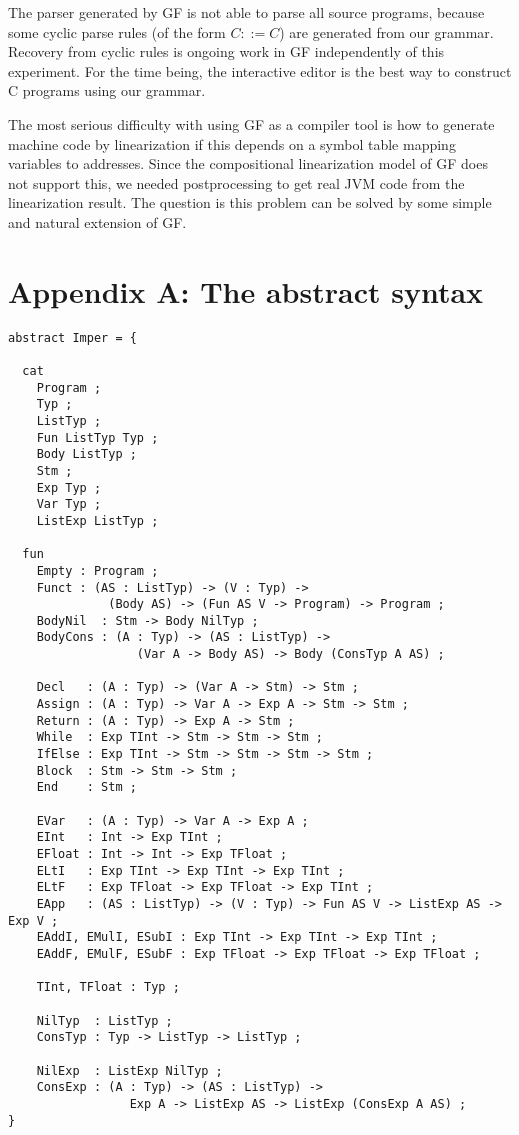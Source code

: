\documentclass[12pt]{article}
\begin{document}
The parser generated by GF is not able to parse all
source programs, because some cyclic parse
rules (of the form $C ::= C$) are generated from our grammar. 
Recovery from cyclic rules is ongoing work in GF independently of this
experiment. For the time being, the interactive editor is the best way to
construct C programs using our grammar.

The most serious difficulty with using GF as a compiler tool
is how to generate machine code by linearization if this depends on
a symbol table mapping variables to addresses.
Since the compositional linearization model of GF does not
support this, we needed postprocessing to get real JVM code
from the linearization result. The question is this problem can
be solved by some simple and natural extension of GF.








\newpage
\section*{Appendix A: The abstract syntax}

\small
\begin{verbatim}
abstract Imper = {

  cat
    Program ;
    Typ ;
    ListTyp ;
    Fun ListTyp Typ ;
    Body ListTyp ;
    Stm ;
    Exp Typ ;
    Var Typ ;
    ListExp ListTyp ;

  fun
    Empty : Program ;
    Funct : (AS : ListTyp) -> (V : Typ) -> 
              (Body AS) -> (Fun AS V -> Program) -> Program ;
    BodyNil  : Stm -> Body NilTyp ;
    BodyCons : (A : Typ) -> (AS : ListTyp) -> 
                  (Var A -> Body AS) -> Body (ConsTyp A AS) ;

    Decl   : (A : Typ) -> (Var A -> Stm) -> Stm ;
    Assign : (A : Typ) -> Var A -> Exp A -> Stm -> Stm ;
    Return : (A : Typ) -> Exp A -> Stm ;
    While  : Exp TInt -> Stm -> Stm -> Stm ;
    IfElse : Exp TInt -> Stm -> Stm -> Stm -> Stm ;
    Block  : Stm -> Stm -> Stm ;
    End    : Stm ;

    EVar   : (A : Typ) -> Var A -> Exp A ;
    EInt   : Int -> Exp TInt ;
    EFloat : Int -> Int -> Exp TFloat ;
    ELtI   : Exp TInt -> Exp TInt -> Exp TInt ;
    ELtF   : Exp TFloat -> Exp TFloat -> Exp TInt ;
    EApp   : (AS : ListTyp) -> (V : Typ) -> Fun AS V -> ListExp AS -> Exp V ;
    EAddI, EMulI, ESubI : Exp TInt -> Exp TInt -> Exp TInt ;
    EAddF, EMulF, ESubF : Exp TFloat -> Exp TFloat -> Exp TFloat ;

    TInt, TFloat : Typ ;

    NilTyp  : ListTyp ;
    ConsTyp : Typ -> ListTyp -> ListTyp ;

    NilExp  : ListExp NilTyp ;
    ConsExp : (A : Typ) -> (AS : ListTyp) -> 
                 Exp A -> ListExp AS -> ListExp (ConsExp A AS) ;
}
\end{verbatim}
\normalsize
\newpage
\end{document}
